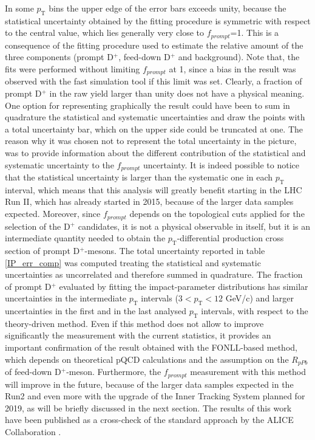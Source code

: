 \documentclass[b5paper,10pt,twoside,oldstyle,classica]{toptesi}
\newcommand{\pt}{p_\text{T}}
\begin{document}
\begin{figure}[tb]
\end{figure} In some $\pt$ bins the upper edge of the error bars exceeds unity, because the statistical uncertainty obtained by the fitting procedure is symmetric with respect to the central value, which lies generally very close to $f_{prompt}$=1. This is a consequence of the fitting procedure used to estimate the relative amount of the three components (prompt D$^+$, feed-down D$^+$ and background). Note that, the fits were performed without limiting $f_{prompt}$ at 1, since a bias in the result was observed with the fast simulation tool if this limit was set. Clearly, a fraction of prompt D$^+$ in the raw yield larger than unity does not have a physical meaning. One option for representing graphically the result could have been to sum in quadrature the statistical and systematic uncertainties and draw the points with a total uncertainty bar, which on the upper side could be truncated at one. The reason why it was chosen not to represent the total uncertainty in the picture, was to provide information about the different contribution of the statistical and systematic uncertainty to the $f_{prompt}$ uncertainty. It is indeed possible to notice that the statistical uncertainty is larger than the systematic one in each $\pt$ interval, which means that this analysis will greatly benefit starting in the LHC Run II, which has already started in 2015, because of the larger data samples expected. Moreover, since $f_{prompt}$ depends on the topological cuts applied for the selection of the D$^+$ candidates, it is not a physical observable in itself, but it is an intermediate quantity needed to obtain the $\pt$-differential production cross section of prompt D$^+$-mesons. The total uncertainty reported in table \ref{IP_err_comp} was computed treating the statistical and systematic uncertainties as uncorrelated and therefore summed in quadrature. The fraction of prompt D$^+$ evaluated by fitting the impact-parameter distributions has similar uncertainties in the intermediate $\pt$ intervals ($3<\pt<12$ GeV/c) and larger uncertainties in the first and in the last analysed $\pt$ intervals, with respect to the theory-driven method. Even if this method does not allow to improve significantly the measurement with the current statistics, it provides an important confirmation of the result obtained with the FONLL-based method, which depends on theoretical pQCD calculations and the assumption on the $R_{pPb}$ of feed-down D$^+$-meson. Furthermore, the $f_{prompt}$ measurement with this method will improve in the future, because of the larger data samples expected in the Run2 and even more with the upgrade of the Inner Tracking System planned for 2019, as will be briefly discussed in the next section. The results of this work have been published as a cross-check of the standard approach by the ALICE Collaboration \cite{Adam:2016ich}. 
\end{document}
